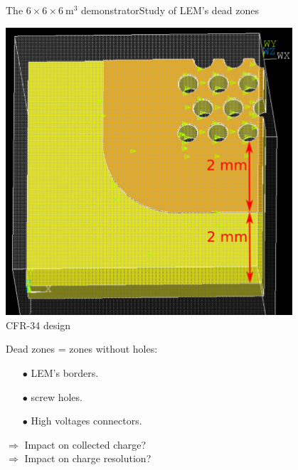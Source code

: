 \documentclass[10pt]{beamer}
\begin{document}
    \begin{frame}{The \texorpdfstring{$6 \times 6 \times \SI{6}{\meter\cubed}$}{666} demonstrator}{Study of LEM's dead zones}
   		\begin{scriptsize}
    		\begin{minipage}{0.38\textwidth}
    			\begin{center}
    				\includegraphics[width=0.8\textwidth]{figures/666/corner_annotations.png}\\
    				CFR-34 design\\
    			\end{center} 
   				Dead zones = zones without holes:
   				\begin{itemize}
   					\item[$\bullet$] LEM's borders.
   					\item[$\bullet$] screw holes.
   					\item[$\bullet$] High voltages connectors.
   				\end{itemize}
   				$\Rightarrow$ Impact on collected charge?\\
   				$\Rightarrow$ Impact on charge resolution?\\
   				

\end{minipage}
\end{scriptsize}
\end{frame}
\end{document}
